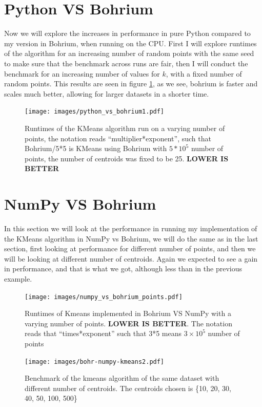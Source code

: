 \documentclass[12pt]{report}
\begin{document}
\section{Python VS Bohrium}
\label{sec:pyvbohrium}
Now we will explore the increases in performance in pure Python compared to my version in Bohrium, when running on the CPU. First I will explore runtimes of the algorithm for an increasing number of random points with the same seed to make sure that the benchmark across runs are fair, then I will conduct the benchmark for an increasing number of values for $k$, with a fixed number of random points. This results are seen in figure \ref{fig:pythonvsbohrium}, as we see, bohrium is faster and scales much better, allowing for larger datasets in a shorter time.

\begin{figure}[H]
  \centering
  \texttt{[image: images/python\_vs\_bohrium1.pdf]}
  \caption{\label{fig:pythonvsbohrium}Runtimes of the KMeans algorithm run on a varying number of points, the notation reads ``multiplier*exponent'', such that Bohrium/5*5 is KMeans using Bohrium with $5*10^5$ number of points, the number of centroids was fixed to be 25. \textbf{LOWER IS BETTER}}
\end{figure}

\section{NumPy VS Bohrium}
\label{sec:numpyvsbohrium}
In this section we will look at the performance in  running my implementation of the KMeans algorithm in  NumPy vs Bohrium, we will do the same as in the last section, first looking at performance for different number of points, and then we will be looking at different number of centroids. Again we expected to see a gain in performance, and that is what we got, although less than in the previous example.

\begin{figure}[H]
  \centering
  \texttt{[image: images/numpy\_vs\_bohrium\_points.pdf]}
  \caption{\label{fig:label}Runtimes of Kmeans implemented in Bohrium VS NumPy with a varying number of points. \textbf{LOWER IS BETTER}. The notation reads that ``times*exponent'' such that 3*5 means $3 \times 10^5$ number of points}
\end{figure}


\begin{figure}[H]
  \centering
  \texttt{[image: images/bohr-numpy-kmeans2.pdf]}
  \caption{\label{fig:bohriumvsnumpy}Benchmark of the kmeans algorithm of the same dataset with different number of centroids. The centroids chosen is \{10, 20, 30, 40, 50, 100, 500\}}
\end{figure}
\end{document}
